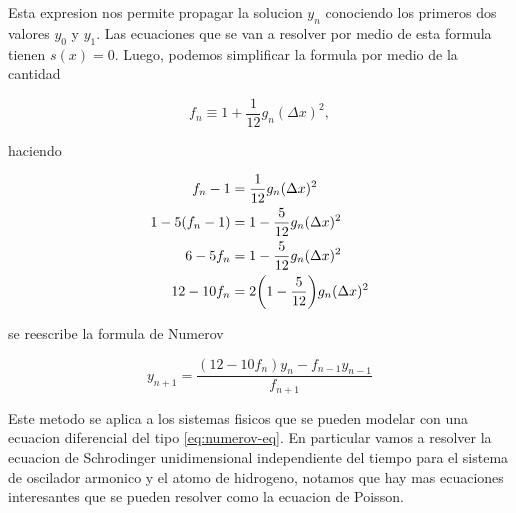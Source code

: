 \documentclass[11pt]{article}
\begin{document}
Esta expresion nos permite propagar la solucion \(y_n\) conociendo los primeros dos valores \(y_0\) y \(y_1\). Las ecuaciones que se van a resolver por medio de esta formula tienen \(s(x)=0\). Luego, podemos simplificar la formula por medio de la cantidad

\[ f_n \equiv 1 + \frac{1}{12}g_n(\Delta x)^2, \]

haciendo

\begin{align*}
    f_n - 1 &= \frac{1}{12}g_n(\Delta x)^2 \\
    1-5(f_n -1) &= 1-\frac{5}{12}g_n(\Delta x)^2 \\
    6-5f_n &= 1-\frac{5}{12}g_n(\Delta x)^2 \\
    12-10f_n &= 2\qty(1-\frac{5}{12})g_n(\Delta x)^2
\end{align*}

se reescribe la formula de Numerov

\begin{equation}
\label{eq:numerov}
    \boxed{y_{n+1} = \frac{(12-10f_n)y_n-f_{n-1}y_{n-1}}{f_{n+1}}}
\end{equation}




Este metodo se aplica a los sistemas fisicos que se pueden modelar con una ecuacion diferencial del tipo \ref{eq:numerov-eq}. En particular vamos a resolver la ecuacion de Schrodinger unidimensional independiente del tiempo para el sistema de oscilador armonico y el atomo de hidrogeno, notamos que hay mas ecuaciones interesantes que se pueden resolver como la ecuacion de Poisson.
\end{document}
